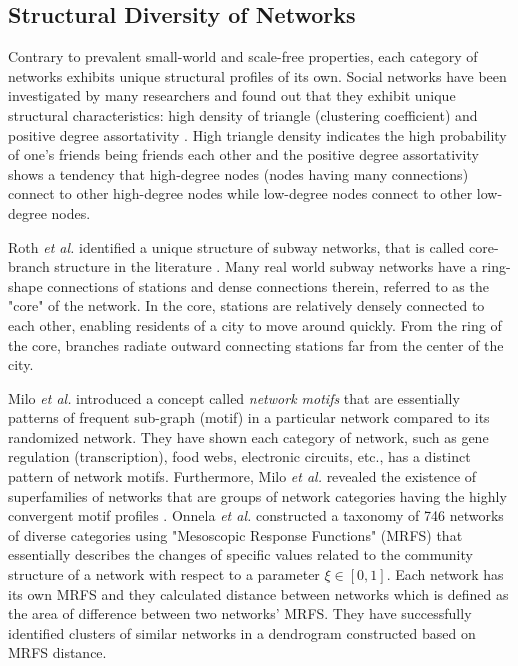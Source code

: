 \documentclass{article}
\begin{document}
	\subsection{Structural Diversity of Networks}
	Contrary to prevalent small-world and scale-free properties, each category of networks exhibits unique structural profiles of its own. Social networks have been investigated by many researchers and found out that they exhibit unique structural characteristics: high density of triangle (clustering coefficient) and positive degree assortativity \cite{WhySocialNetworks, Mislove:2007:OnlineSocial}. High triangle density indicates the high probability of one's friends being friends each other and the positive  degree assortativity shows a tendency that high-degree nodes (nodes having many connections) connect to other high-degree nodes while low-degree nodes connect to other low-degree nodes.
	
	Roth \textit{et al.} identified a unique structure of subway networks, that is called core-branch structure in the literature \cite{Train}. Many real world subway networks have a ring-shape connections of stations and dense connections therein, referred to as the "core" of the network. In the core, stations are relatively densely connected to each other, enabling residents of a city to move around quickly. From the ring of the core, branches radiate outward connecting stations far from the center of the city. 
	
	Milo \textit{et al.} introduced a concept called \textit{network motifs} that are essentially patterns of frequent sub-graph (motif) in a particular network compared to its randomized network\cite{Milo_motif}. They have shown each category of network, such as gene regulation (transcription), food webs, electronic circuits, etc., has a distinct pattern of network motifs. Furthermore, Milo \textit{et al.} revealed the existence of superfamilies of networks that  are groups of network categories having the highly convergent motif profiles \cite{Milo_SuperFamily}. Onnela \textit{et al.} constructed a taxonomy of 746 networks  of diverse categories using "Mesoscopic Response Functions" (MRFS) that essentially describes the changes of specific values related to the community structure of a network with respect to a parameter $\xi \in [0,1]$\cite{Onnela_Taxonomy}. Each network has its own MRFS and they calculated distance between networks which is defined as the area of difference between two networks' MRFS. They have successfully identified clusters of similar networks in a dendrogram constructed based on MRFS distance.
	
\end{document}
